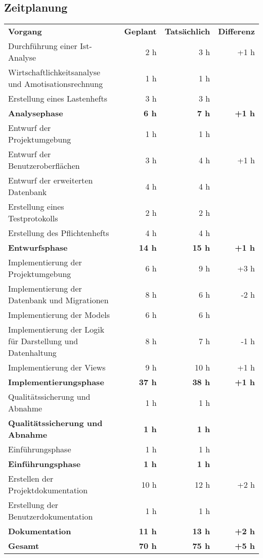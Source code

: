 \subsection{Zeitplanung}
\label{subsec:Zeitplan}

\begin{tabularx}{\textwidth}{Xrrr}
\rowcolor{heading}\textbf{Vorgang} & \textbf{Geplant} & \textbf{Tatsächlich} & \textbf{Differenz} \\
Durchführung einer Ist-Analyse & 2 h   & 3 h   & +1 h \\
\rowcolor{odd}Wirtschaftlichkeitsanalyse und Amotisationsrechnung & 1 h   & 1 h   &  \\
Erstellung eines Lastenhefts & 3 h   & 3 h   &  \\
\rowcolor{heading}\textbf{Analysephase} & \textbf{6 h} & \textbf{7 h} & \textbf{+1 h} \\
Entwurf der Projektumgebung & 1 h & 1 h &  \\
\rowcolor{odd}Entwurf der Benutzeroberflächen & 3 h & 4 h & +1 h \\
Entwurf der erweiterten Datenbank & 4 h & 4 h &  \\
\rowcolor{odd}Erstellung eines Testprotokolls & 2 h & 2 h &  \\
Erstellung des Pflichtenhefts & 4 h & 4 h &  \\
\rowcolor{heading}\textbf{Entwurfsphase} & \textbf{14 h} & \textbf{15 h} & \textbf{+1 h} \\
Implementierung der Projektumgebung & 6 h & 9 h & +3 h \\
\rowcolor{odd}Implementierung der Datenbank und Migrationen & 8 h & 6 h & -2 h \\
Implementierung der Models & 6 h & 6 h &  \\
\rowcolor{odd}Implementierung der Logik für Darstellung und Datenhaltung & 8 h & 7 h & -1 h \\
Implementierung der Views & 9 h & 10 h & +1 h \\
\rowcolor{heading}\textbf{Implementierungsphase} & \textbf{37 h} & \textbf{38 h} & \textbf{+1 h} \\
Qualitätssicherung und Abnahme & 1 h & 1 h   &  \\
\rowcolor{heading}\textbf{Qualitätssicherung und Abnahme} & \textbf{1 h} & \textbf{1 h} & \textbf{} \\
Einführungsphase & 1 h   & 1 h   &  \\
\rowcolor{heading}\textbf{Einführungsphase} & \textbf{1 h} & \textbf{1 h} & \textbf{} \\
Erstellen der Projektdokumentation & 10 h   & 12 h  & +2 h \\
\rowcolor{odd}Erstellung der Benutzerdokumentation & 1 h   & 1 h   &  \\
\rowcolor{heading}\textbf{Dokumentation} & \textbf{11 h} & \textbf{13 h} & \textbf{+2 h} \\
\hline
\hline
\rowcolor{heading}\textbf{Gesamt} & \textbf{70 h} & \textbf{75 h} & \textbf{+5 h} \\
\end{tabularx}
